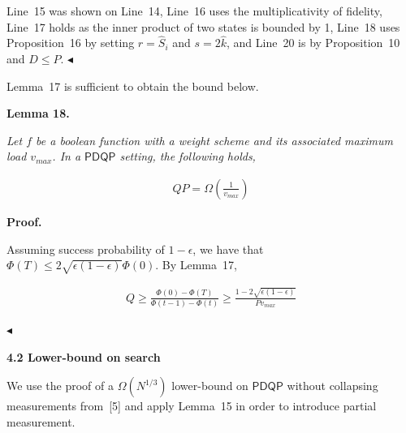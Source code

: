 Line 15 was shown on Line 14, Line 16 uses the multiplicativity of fidelity, Line 17 holds as the inner product of two states is bounded by 1, Line 18 uses Proposition 16 by setting $r=\hat{S}_{i}$ and $s=2\hat{k}$, and Line 20 is by Proposition 10 and $D\leq P$.
$\blacktriangleleft$\par




Lemma 17 is sufficient to obtain the bound below.\par





\par\medskip\noindent\textbf{
\textbf{Lemma 18}\textbf{.}
}\par



\emph{Let $f$ be a boolean function with a weight scheme and its associated maximum load $v_{max}$. In a $\mathsf{PDQP}$ setting, the following holds,}\par


\[\begin{gathered}
\displaystyle QP=\Omega\left(\frac{1}{v_{max}}\right)
\end{gathered}\]







\par\medskip\noindent\textbf{Proof.}\par




Assuming success probability of $1-\epsilon$, we have that $\Phi(T)\leq 2\sqrt{\epsilon(1-\epsilon)}\Phi(0)$. By Lemma 17,\par


\[\begin{gathered}
\displaystyle Q\geq\frac{\Phi(0)-\Phi(T)}{\Phi(t-1)-\Phi(t)}\geq\frac{1-2\sqrt{\epsilon(1-\epsilon)}}{Pv_{max}}
\end{gathered}\]


$\blacktriangleleft$\par






\par\medskip\noindent\textbf{
4.2 Lower-bound on search}\par




We use the proof of a $\Omega(N^{1/3})$ lower-bound on $\mathsf{PDQP}$ without collapsing measurements from [5] and apply Lemma 15 in order to introduce partial measurement.\par



